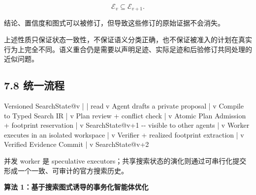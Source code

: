\documentclass[
  11pt]{ctexart}
\newenvironment{Shaded}{}{}
\newcommand{\NormalTok}[1]{#1}
\begin{document}
\[
\mathcal{E}_{v}\subseteq\mathcal{E}_{v+1}.
\]

结论、置信度和图式可以被修订，但导致这些修订的原始证据不会消失。

上述性质只保证状态一致性，不保证语义分类正确，也不保证被准入的计划在真实行为上完全不同。语义重合仍是需要以声明足迹、实际足迹和后验修订共同处理的近似问题。

\subsection{7.8 统一流程}\label{ux7edfux4e00ux6d41ux7a0b}

\begin{Shaded}
\begin{Highlighting}[]
\NormalTok{Versioned SearchState@v}
\NormalTok{        |}
\NormalTok{        | read}
\NormalTok{        v}
\NormalTok{Agent drafts a private proposal}
\NormalTok{        |}
\NormalTok{        v}
\NormalTok{Compile to Typed Search IR}
\NormalTok{        |}
\NormalTok{        v}
\NormalTok{Plan review + conflict check}
\NormalTok{        |}
\NormalTok{        v}
\NormalTok{Atomic Plan Admission + footprint reservation}
\NormalTok{        |}
\NormalTok{        v}
\NormalTok{SearchState@v+1  {-}{-} visible to other agents}
\NormalTok{        |}
\NormalTok{        v}
\NormalTok{Worker executes in an isolated workspace}
\NormalTok{        |}
\NormalTok{        v}
\NormalTok{Verifier + realized footprint extraction}
\NormalTok{        |}
\NormalTok{        v}
\NormalTok{Verified Evidence Commit}
\NormalTok{        |}
\NormalTok{        v}
\NormalTok{SearchState@v+2}
\end{Highlighting}
\end{Shaded}

并发 worker 是 speculative
executors；共享搜索状态的演化则通过可串行化提交形成一个一致、可审计的官方搜索历史。

\textbf{算法 1：基于搜索图式诱导的事务化智能体优化}
\end{document}
